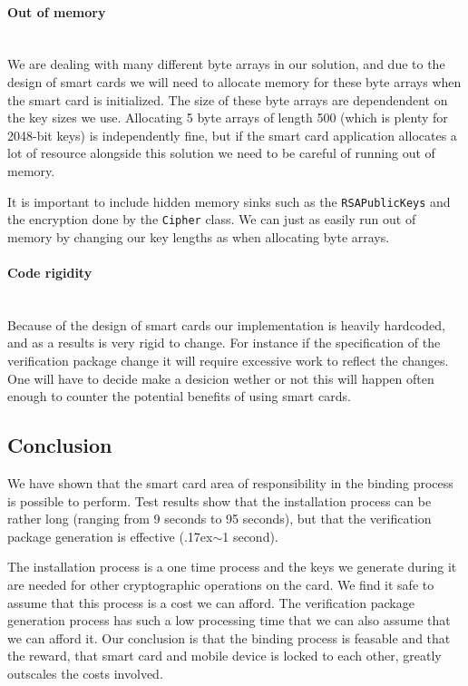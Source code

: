 \paragraph{Out of memory}\mbox{}\\
We are dealing with many different byte arrays in our solution, and due to the design of smart cards we will need to allocate memory for these byte arrays when the smart card is initialized. The size of these byte arrays are dependendent on the key sizes we use. Allocating 5 byte arrays of length 500 (which is plenty for 2048-bit keys) is independently fine, but if the smart card application allocates a lot of resource alongside this solution we need to be careful of running out of memory.

It is important to include hidden memory sinks such as the \texttt{RSAPublicKeys} and the encryption done by the \texttt{Cipher} class. We can just as easily run out of memory by changing our key lengths as when allocating byte arrays.

\paragraph{Code rigidity}\mbox{}\\
Because of the design of smart cards our implementation is heavily hardcoded, and as a results is very rigid to change. For instance if the specification of the verification package change it will require excessive work to reflect the changes. One will have to decide make a desicion wether or not this will happen often enough to counter the potential benefits of using smart cards.

\subsection{Conclusion}
We have shown that the smart card area of responsibility in the binding process is possible to perform. Test results show that the installation process can be rather long (ranging from 9 seconds to 95 seconds), but that the verification package generation is effective ({\raise.17ex\hbox{$\scriptstyle\sim$}}1 second).

The installation process is a one time process and the keys we generate during it are needed for other cryptographic operations on the card. We find it safe to assume that this process is a cost we can afford. The verification package generation process has such a low processing time that we can also assume that we can afford it. Our conclusion is that the binding process is feasable and that the reward, that smart card and mobile device is locked to each other, greatly outscales the costs involved.

